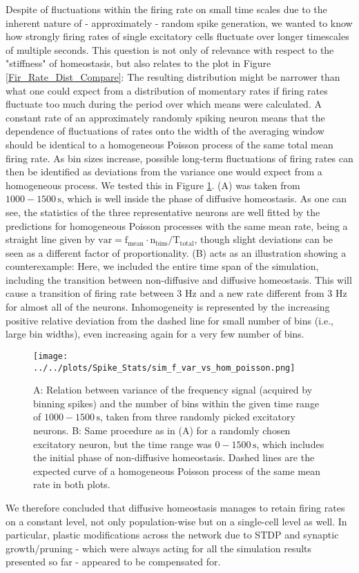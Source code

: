 \documentclass[10pt,a4paper]{article}
\begin{document}
Despite of fluctuations within the firing rate on small time scales due to the inherent nature of - approximately - random spike generation, we wanted to know how strongly firing rates of single excitatory cells fluctuate over longer timescales of multiple seconds. This question is not only of relevance with respect to the "stiffness" of homeostasis, but also relates to the plot in Figure \ref{Fir_Rate_Dist_Compare}: The resulting distribution might be narrower than what one could expect from a distribution of momentary rates if firing rates fluctuate too much during the period over which means were calculated. A constant rate of an approximately randomly spiking neuron means that the dependence of fluctuations of rates onto the width of the averaging window should be identical to a homogeneous Poisson process of the same total mean firing rate. As bin sizes increase, possible long-term fluctuations of firing rates can then be identified as deviations from the variance one would expect from a homogeneous process. We tested this in Figure \ref{f_Var_vs_n_Bin}. (A) was taken from $\mathrm{1000-1500\,s}$, which is well inside the phase of diffusive homeostasis. As one can see, the statistics of the three representative neurons are well fitted by the predictions for homogeneous Poisson processes with the same mean rate, being a straight line given by $\mathrm{var = f_{mean}\cdot n_{bins}/T_{total}}$, though slight deviations can be seen as a different factor of proportionality. (B) acts as an illustration showing a counterexample: Here, we included the entire time span of the simulation, including the transition between non-diffusive and diffusive homeostasis. This will cause a transition of firing rate between 3 Hz and a new rate different from 3 Hz for almost all of the neurons. Inhomogeneity is represented by the increasing positive relative deviation from the dashed line for small number of bins (i.e., large bin widths), even increasing again for a very few number of bins.
\begin{figure}
\texttt{[image: ../../plots/Spike\_Stats/sim\_f\_var\_vs\_hom\_poisson.png]}
\caption{A: Relation between variance of the frequency signal (acquired by binning spikes) and the number of bins within the given time range of $\mathrm{1000-1500\,s}$, taken from three randomly picked excitatory neurons. B: Same procedure as in (A) for a randomly chosen excitatory neuron, but the time range was $\mathrm{0-1500\,s}$, which includes the initial phase of non-diffusive homeostasis. Dashed lines are the expected curve of a homogeneous Poisson process of the same mean rate in both plots.}
\label{f_Var_vs_n_Bin}
\end{figure}
We therefore concluded that diffusive homeostasis manages to retain firing rates on a constant level, not only population-wise but on a single-cell level as well. In particular, plastic modifications across the network due to STDP and synaptic growth/pruning - which were always acting for all the simulation results presented so far - appeared to be compensated for.
\end{document}

